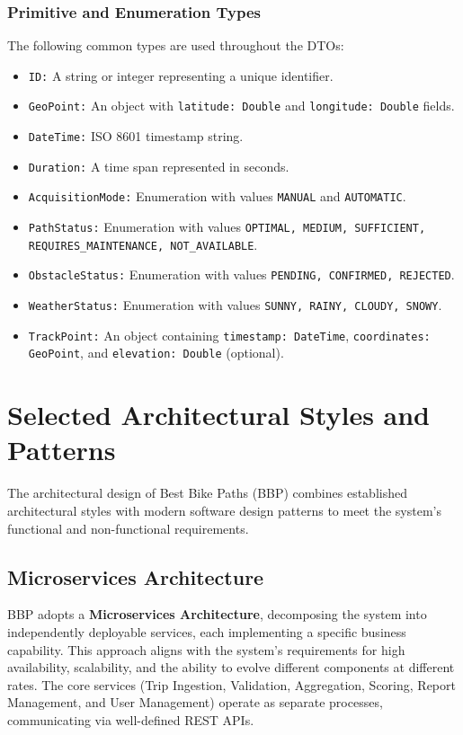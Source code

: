 \subsubsection{Primitive and Enumeration Types}
The following common types are used throughout the DTOs:
\begin{itemize}
    \item \texttt{ID:} A string or integer representing a unique identifier.
    \item \texttt{GeoPoint:} An object with \texttt{latitude: Double} and \texttt{longitude: Double} fields.
    \item \texttt{DateTime:} ISO 8601 timestamp string.
    \item \texttt{Duration:} A time span represented in seconds.
    \item \texttt{AcquisitionMode:} Enumeration with values \texttt{MANUAL} and \texttt{AUTOMATIC}.
    \item \texttt{PathStatus:} Enumeration with values \texttt{OPTIMAL, MEDIUM, SUFFICIENT, REQUIRES\_MAINTENANCE, NOT\_AVAILABLE}.
    \item \texttt{ObstacleStatus:} Enumeration with values \texttt{PENDING, CONFIRMED, REJECTED}.
    \item \texttt{WeatherStatus:} Enumeration with values \texttt{SUNNY, RAINY, CLOUDY, SNOWY}.
    \item \texttt{TrackPoint:} An object containing \texttt{timestamp: DateTime}, \texttt{coordinates: GeoPoint}, and \texttt{elevation: Double} (optional).
\end{itemize}
\section{Selected Architectural Styles and Patterns}
\label{sec:selected-architectural-styles-patterns}

The architectural design of Best Bike Paths (BBP) combines established architectural styles with modern software design patterns to meet the system's functional and non-functional requirements.

\subsection{Microservices Architecture}
BBP adopts a \textbf{Microservices Architecture}, decomposing the system into independently deployable services, each implementing a specific business capability. This approach aligns with the system's requirements for high availability, scalability, and the ability to evolve different components at different rates. The core services (Trip Ingestion, Validation, Aggregation, Scoring, Report Management, and User Management) operate as separate processes, communicating via well-defined REST APIs.

